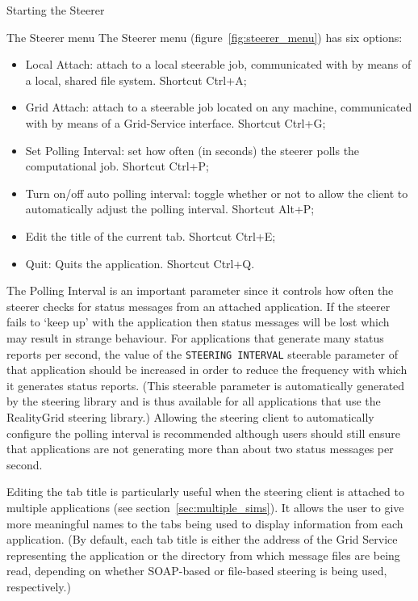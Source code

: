 \documentclass[a4paper,twoside]{article}
\begin{document}
\begin{section}{Starting the Steerer}
\begin{subsection}{The Steerer menu}
The Steerer menu (figure~\ref{fig:steerer_menu}) has six options:
\begin{itemize}
\item Local Attach: attach to a local steerable job, 
communicated with by means of a local, shared file system. 
Shortcut Ctrl+A;
\item Grid Attach: attach to a steerable job located on 
any machine, communicated with by means of a Grid-Service 
interface. Shortcut Ctrl+G;
\item Set Polling Interval: set how often (in seconds) the 
steerer polls the computational job. Shortcut Ctrl+P;
\item Turn on/off auto polling interval: toggle whether or not 
to allow the client to automatically adjust the polling 
interval. Shortcut Alt+P;
\item Edit the title of the current tab. Shortcut Ctrl+E;
\item Quit: Quits the application. Shortcut Ctrl+Q.
\end{itemize}

The Polling Interval is an important parameter since it controls how
often the steerer checks for status messages from an attached
application.  If the steerer fails to `keep up' with the application
then status messages will be lost which may result in strange
behaviour.  For applications that generate many status reports per
second, the value of the \texttt{STEERING INTERVAL} steerable
parameter of that application should be increased in order to reduce
the frequency with which it generates status reports. (This steerable
parameter is automatically generated by the steering library and is
thus available for all applications that use the RealityGrid steering
library.)  Allowing the steering client to automatically configure the
polling interval is recommended although users should still ensure
that applications are not generating more than about two status
messages per second.

Editing the tab title is particularly useful when the steering client
is attached to multiple applications (see
section~\ref{sec:multiple_sims}).  It allows the user to give more
meaningful names to the tabs being used to display information from
each application.  (By default, each tab title is either the address
of the Grid Service representing the application or the directory from
which message files are being read, depending on whether SOAP-based or
file-based steering is being used, respectively.)

\end{subsection}


\end{section}
\end{document}
